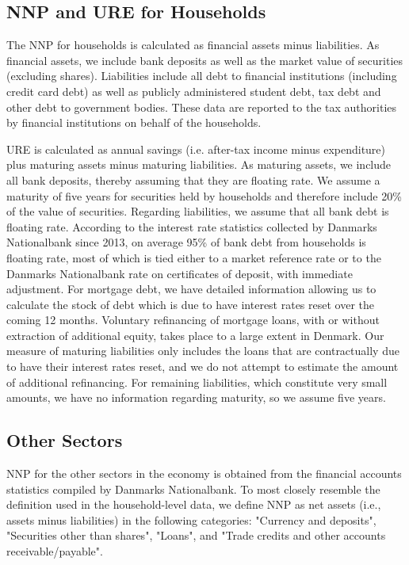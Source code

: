 \documentclass[titlepage]{\econtex}\newcommand{\texname}{ConsumptionHeterogeneity}
\begin{document}
	\subsection{NNP and URE for Households}
	The NNP for households is calculated as financial assets minus liabilities. As financial assets, we include bank deposits as well as the market value of securities (excluding shares). Liabilities include all debt to financial institutions (including credit card debt) as well as publicly administered student debt, tax debt and other debt to government bodies. These data are reported to the tax authorities by financial institutions on behalf of the households. 
	
	URE is calculated as annual savings (i.e. after-tax income minus expenditure) plus maturing assets minus maturing liabilities. As maturing assets, we include all bank deposits, thereby assuming that they are floating rate. We assume a maturity of five years for securities held by households and therefore include 20\% of the value of securities. Regarding liabilities, we assume that all bank debt is floating rate. According to the interest rate statistics collected by Danmarks Nationalbank since 2013, on average 95\% of bank debt from households is floating rate, most of which is tied either to a market reference rate or to the Danmarks Nationalbank rate on certificates of deposit, with immediate adjustment. For mortgage debt, we have detailed information allowing us to calculate the stock of debt which is due to have interest rates reset over the coming 12 months. Voluntary refinancing of mortgage loans, with or without extraction of additional equity, takes place to a large extent in Denmark. Our measure of maturing liabilities only includes the loans that are contractually due to have their interest rates reset, and we do not attempt to estimate the amount of additional refinancing. For remaining liabilities, which constitute very small amounts, we have no information regarding maturity, so we assume five years. 
	
	\subsection{Other Sectors}
	NNP for the other sectors in the economy is obtained from the financial accounts statistics compiled by Danmarks Nationalbank. To most closely resemble the definition used in the household-level data, we define NNP as net assets (i.e., assets minus liabilities) in the following categories: "Currency and deposits", "Securities other than shares", "Loans", and "Trade credits and other accounts receivable/payable". 
	
\end{document}
